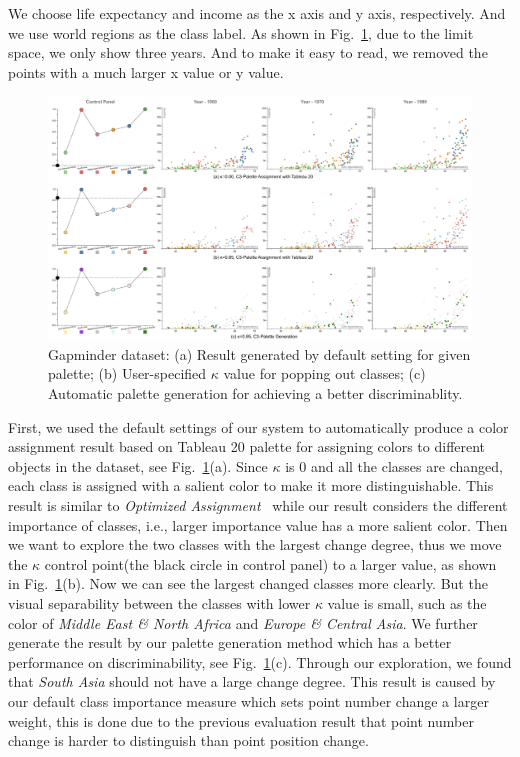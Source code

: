 \documentclass[review,onecolumn]{vgtc}                %
\begin{document}
We choose life expectancy and income as the x axis and y axis, respectively. And we use world regions as the class label. As shown in Fig.~\ref{fig:casestudy}, due to the limit space, we only show three years. And to make it easy to read, we removed the points with a much larger x value or y value.
\begin{figure}[h]
\centering
\includegraphics[width=\linewidth]{case-study.pdf}
\caption{Gapminder dataset: (a) Result generated by default setting for given palette; (b) User-specified $\kappa$ value for popping out classes; (c) Automatic palette generation for achieving a better discriminablity.}
\label{fig:casestudy}
\vspace{-4mm}
\end{figure}
First, we used the default settings of our system to automatically produce a color assignment result based on Tableau 20 palette for assigning colors to different objects in the dataset, see Fig.~\ref{fig:casestudy}(a). Since $\kappa$ is $0$ and all the classes are changed, each class is assigned with a salient color to make it more distinguishable. This result is similar to \emph{Optimized Assignment}~\cite{Wang2018} while our result considers the different importance of classes, i.e., larger importance value has a more salient color.
Then we want to explore the two classes with the largest change degree, thus we move the $\kappa$ control point(the black circle in control panel) to a larger value, as shown in Fig.~\ref{fig:casestudy}(b). Now we can see the largest changed classes more clearly. But the visual separability between the classes with lower $\kappa$ value is small, such as the color of \emph{Middle East \& North Africa} and \emph{Europe \& Central Asia}. We further generate the result by our palette generation method which has a better performance on discriminability, see Fig.~\ref{fig:casestudy}(c).
Through our exploration, we found that \emph{South Asia} should not have a large change degree. This result is caused by our default class importance measure which sets point number change a larger weight, this is done due to the previous evaluation result that point number change is harder to distinguish than point position change.
\end{document}
